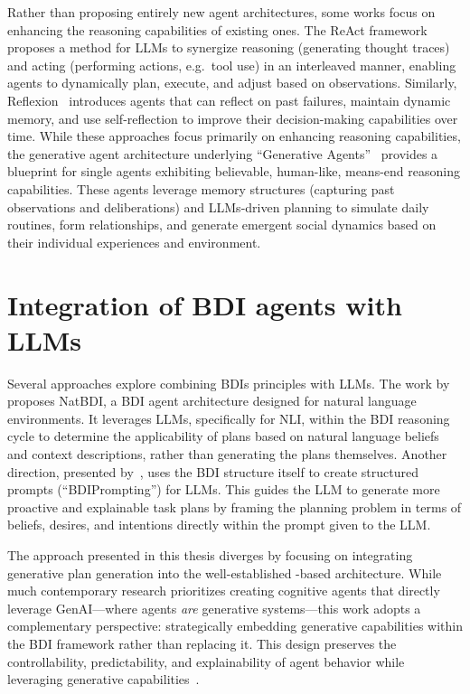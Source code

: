 \documentclass[12pt,a4paper,openright,twoside]{book}
\begin{document}
Rather than proposing entirely new agent architectures, some works focus on enhancing the reasoning capabilities of existing ones.
%
The \ac{ReAct} framework~\cite{YaoZYDSN023} proposes a method for \acp{LLM} to synergize reasoning (generating thought traces) and acting (performing actions, e.g.\, tool use) in an interleaved manner, enabling agents to dynamically plan, execute, and adjust based on observations.
%
Similarly, Reflexion~\cite{ShinnCGNY23} introduces agents that can reflect on past failures,
maintain dynamic memory, and use self-reflection to improve their decision-making capabilities over time.
%
While these approaches focus primarily on enhancing reasoning capabilities, the generative agent architecture underlying ``Generative Agents''~\cite{ParkOCMLB23} provides a blueprint for single agents exhibiting believable, human-like, means-end reasoning capabilities.
%
These agents leverage memory structures (capturing past observations and deliberations) and \acp{LLM}-driven planning to simulate daily routines, form relationships, and generate emergent social dynamics based on their individual experiences and environment.

\section{Integration of BDI agents with LLMs}

Several approaches explore combining \acp{BDI} principles with \acp{LLM}.
%
The work by~\cite{IchidaM024} proposes NatBDI, a \ac{BDI} agent architecture designed for natural language environments.
%
It leverages \acp{LLM}, specifically for \ac{NLI}, within the \ac{BDI} reasoning cycle to determine the applicability of plans based on natural language beliefs and context descriptions, rather than generating the plans themselves.
%
Another direction, presented by~\cite{JangYCO023}, uses the \ac{BDI} structure itself to create structured prompts (``BDIPrompting'') for \acp{LLM}.
%
This guides the \ac{LLM} to generate more proactive and explainable task plans by framing the planning problem in terms of beliefs, desires, and intentions directly within the prompt given to the \ac{LLM}.

The approach presented in this thesis diverges by focusing on integrating generative plan generation into the well-established \agentspeak{}-based architecture. 
%
While much contemporary research prioritizes creating cognitive agents that directly leverage \ac{GenAI}—where agents \emph{are} generative systems—this work adopts a complementary perspective: strategically embedding generative capabilities within the \ac{BDI} framework rather than replacing it. 
%
This design preserves the controllability, predictability, and explainability of agent behavior while leveraging generative capabilities~\cite{ricci2024atal}.
\end{document}
